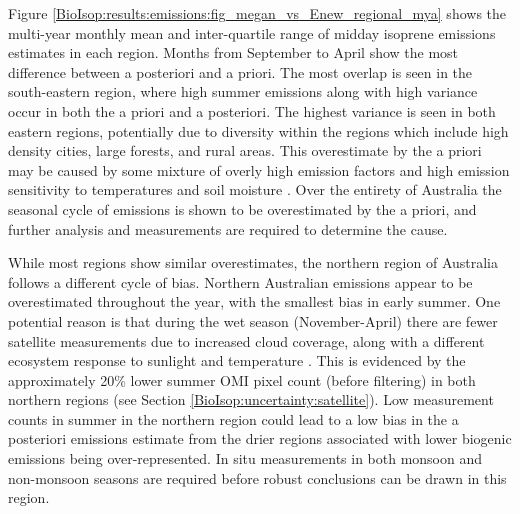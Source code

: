     
    
    Figure \ref{BioIsop:results:emissions:fig_megan_vs_Enew_regional_mya} shows the multi-year monthly mean and inter-quartile range of midday isoprene emissions estimates in each region. 
    Months from September to April show the most difference between a posteriori and a priori.
    The most overlap is seen in the south-eastern region, where high summer emissions along with high variance occur in both the a priori and a posteriori.
    The highest variance is seen in both eastern regions, potentially due to diversity within the regions which include high density cities, large forests, and rural areas.
    This overestimate by the a priori may be caused by some mixture of overly high emission factors and high emission sensitivity to temperatures and soil moisture \parencite{Emmerson2016,Emmerson2019}.
    Over the entirety of Australia the seasonal cycle of emissions is shown to be overestimated by the a priori, and further analysis and measurements are required to determine the cause.
    
    While most regions show similar overestimates, the northern region of Australia follows a different cycle of bias.
    Northern Australian emissions appear to be overestimated throughout the year, with the smallest bias in early summer.
    One potential reason is that during the wet season (November-April) there are fewer satellite measurements due to increased cloud coverage, along with a different ecosystem response to sunlight and temperature \parencite[e.g.,][]{Surl2018}.
    This is evidenced by the approximately 20\% lower summer OMI pixel count (before filtering) in both northern regions (see Section \ref{BioIsop:uncertainty:satellite}).
    Low measurement counts in summer in the northern region could lead to a low bias in the a posteriori emissions estimate from the drier regions associated with lower biogenic emissions being over-represented.
    In situ measurements in both monsoon and non-monsoon seasons are required before robust conclusions can be drawn in this region.
    
